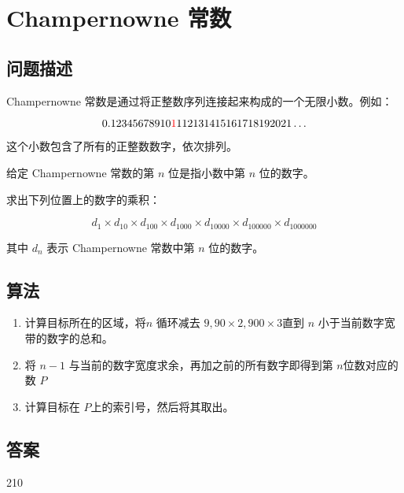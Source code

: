 \section{Champernowne 常数}\label{sec:problem40}
\subsection{问题描述}
\begin{tcolorbox}

	Champernowne 常数是通过将正整数序列连接起来构成的一个无限小数。例如：

	\[
		0.12345678910\textcolor{red}{1}112131415161718192021\ldots
	\]

	这个小数包含了所有的正整数数字，依次排列。

	给定 Champernowne 常数的第 \( n \) 位是指小数中第 \( n \) 位的数字。

	求出下列位置上的数字的乘积：

	\[
		d_1 \times d_{10} \times d_{100} \times d_{1000} \times d_{10000} \times d_{100000} \times d_{1000000}
	\]

	其中 \( d_n \) 表示 Champernowne 常数中第 \( n \) 位的数字。
\end{tcolorbox}

\subsection{算法}
\begin{enumerate}
	\item 计算目标所在的区域，将$ n $ 循环减去 \( 9, 90 \times 2, 900 \times 3 \)直到 \( n \) 小于当前数字宽带的数字的总和。
	\item 将 \( n  - 1\) 与当前的数字宽度求余，再加之前的所有数字即得到第 \( n \)位数对应的数 \( P \)
	\item 计算目标在 	\( P \)上的索引号，然后将其取出。
\end{enumerate}

\subsection{答案}
210
